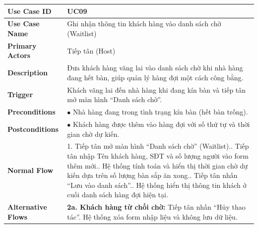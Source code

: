 \begin{longtable}{|L{3.5cm}|L{12.5cm}|}
\hline
\textbf{Use Case ID} & UC09 \\ \hline
\textbf{Use Case Name} & Ghi nhận thông tin khách hàng vào danh sách chờ (Waitlist) \\ \hline
\textbf{Primary Actors} & Tiếp tân (Host) \\ \hline
\textbf{Description} & Đưa khách hàng vãng lai vào danh sách chờ khi nhà hàng đang hết bàn, giúp quản lý hàng đợi một cách công bằng. \\ \hline
\textbf{Trigger} & Khách vãng lai đến nhà hàng khi đang kín bàn và tiếp tân mở màn hình ``Danh sách chờ''. \\ \hline
\textbf{Preconditions} & $\bullet$ Nhà hàng đang trong tình trạng kín bàn (hết bàn trống). \\ \hline
\textbf{Postconditions} &
$\bullet$ Khách hàng được thêm vào hàng đợi với số thứ tự và thời gian chờ dự kiến. \\ \hline
\textbf{Normal Flow} &
1. Tiếp tân mở màn hình ``Danh sách chờ'' (Waitlist).. Tiếp tân nhập Tên khách hàng, SĐT và số lượng người vào form thêm mới.. Hệ thống tính toán và hiển thị thời gian chờ dự kiến dựa trên số lượng bàn sắp ăn xong.. Tiếp tân nhấn ``Lưu vào danh sách''.. Hệ thống hiển thị thông tin khách ở cuối danh sách hàng đợi hiện tại. \\ \hline
\textbf{Alternative Flows} &
\textbf{2a. Khách hàng từ chối chờ:} Tiếp tân nhấn ``Hủy thao tác''. Hệ thống xóa form nhập liệu và không lưu dữ liệu. \\ \hline
\end{longtable}


